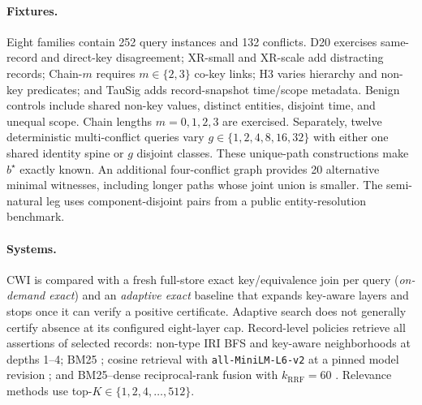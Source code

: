 \documentclass[letterpaper]{article} %
\newcommand{\cwi}{\textsc{CWI}}
\begin{document}
\paragraph{Fixtures.}
Eight families contain 252 query instances and 132 conflicts.  D20 exercises
same-record and direct-key disagreement; XR-small and XR-scale add distracting
records; Chain-$m$ requires $m\in\{2,3\}$ co-key links; H3 varies hierarchy and
non-key predicates; and TauSig adds record-snapshot time/scope metadata.
Benign controls include shared non-key values, distinct entities, disjoint
time, and unequal scope.  Chain lengths $m=0,1,2,3$ are exercised.
Separately, twelve deterministic multi-conflict queries vary
$g\in\{1,2,4,8,16,32\}$ with either one shared identity spine or $g$ disjoint
classes.  These unique-path constructions make $b^\star$ exactly known.
An additional four-conflict graph provides 20 alternative minimal witnesses,
including longer paths whose joint union is smaller.  The semi-natural leg
uses component-disjoint pairs from a public entity-resolution benchmark.

\paragraph{Systems.}
\cwi{} is compared with a fresh full-store exact key/equivalence join per query
(\emph{on-demand exact}) and an \emph{adaptive exact} baseline that expands
key-aware layers and stops once it can verify a positive certificate.
Adaptive search does not generally certify absence at its configured
eight-layer cap.  Record-level policies retrieve all assertions of selected
records: non-type IRI BFS and key-aware neighborhoods at depths 1--4; BM25
\citep{robertson2009bm25}; cosine retrieval with
\texttt{all-MiniLM-L6-v2} at a pinned model revision
\citep{reimers2019sbert}; and BM25--dense reciprocal-rank fusion with
$k_{\mathrm{RRF}}=60$ \citep{cormack2009rrf}.  Relevance methods use
top-$K\in\{1,2,4,\ldots,512\}$.
\end{document}
